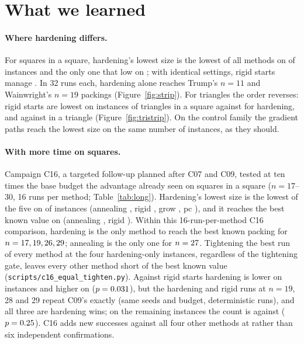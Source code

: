 \section{What we learned}\label{sec:learned}
\paragraph{Where hardening differs.} For squares in a square, hardening's lowest size is the lowest of all methods on \CsevenSquInSquHardenLowest{} of \CsevenSquInSquN{} instances and the only one that low on \CsevenSquInSquHardenSole{}; with identical settings, rigid starts manage \CsevenSquInSquRigidLowest{}. In 32 runs each, hardening alone reaches Trump's $n=11$ and Wainwright's $n=19$ packings (Figure~\ref{fig:strip}). For triangles the order reverses: rigid starts are lowest on \CsevenTriInSquRigidLowest{} instances of triangles in a square against \CsevenTriInSquHardenLowest{} for hardening, and \CsevenTriInTriRigidLowest{} against \CsevenTriInTriHardenLowest{} in a triangle (Figure~\ref{fig:tristrip}). On the control family the gradient paths reach the lowest size on the same number of instances, as they should.

\paragraph{With more time on squares.} Campaign C16, a targeted follow-up planned after C07 and C09, tested at ten times the base budget the advantage already seen on squares in a square ($n=17$--$30$, 16 runs per method; Table~\ref{tab:long}). Hardening's lowest size is the lowest of the five on \LongHardenLowest{} of \LongN{} instances (annealing \LongSaLowest, rigid \LongRigidLowest, grow \LongGrowLowest, pc \LongPcLowest), and it reaches the best known value on \LongHardenReached{} (annealing \LongSaReached, rigid \LongRigidReached). Within this 16-run-per-method C16 comparison, hardening is the only method to reach the best known packing for $n=17, 19, 26, 29$; annealing is the only one for $n=27$. Tightening the best run of every method at the four hardening-only instances, regardless of the tightening gate, leaves every other method short of the best known value (\texttt{scripts/c16\_equal\_tighten.py}). Against rigid starts hardening is lower on \LongHLower{} instances and higher on \LongRLower{} ($p=0.031$), but the hardening and rigid runs at $n=19$, 28 and 29 repeat C09's exactly (same seeds and budget, deterministic runs), and all three are hardening wins; on the remaining \LongNewN{} instances the count is \LongNewHLower{} against \LongNewRLower{} ($p=0.25$). C16 adds new successes against all four other methods at \LongHardenOnlyReachedNewNs{} rather than six independent confirmations.

